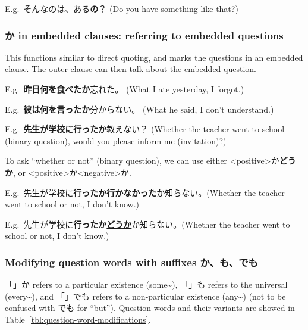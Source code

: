 \documentclass[../nihongo-gakushuu-kyouzai.tex]{subfiles}
\begin{document}
E.g.\ そんなのは、ある\textbf{の}？ (Do you have something like that?)

\subsubsection{か in embedded clauses: referring to embedded questions}
This functions similar to direct quoting, and marks the questions in an embedded clause. The outer clause can then talk about the embedded question.

E.g.\ \textbf{昨日何を食べたか}忘れた。 (What I ate yesterday, I forgot.)

E.g.\ \textbf{彼は何を言ったか}分からない。 (What he said, I don't understand.)

E.g.\ \textbf{先生が学校に行ったか}教えない？ (Whether the teacher went to school (binary question), would you please inform me (invitation)?)

To ask ``whether or not'' (binary question), we can use either <positive>か\textbf{どうか}, or <positive>か<negative>か.

E.g.\ 先生が学校に\textbf{行ったか行かなかった}か知らない。(Whether the teacher went to school or not, I don't know.)

E.g.\ 先生が学校に\textbf{行ったか\ul{どうか}}か知らない。(Whether the teacher went to school or not, I don't know.)


\subsubsection{Modifying question words with suffixes か、も、でも}
「」か refers to a particular existence (some\textasciitilde), 「」も refers to the universal (every\textasciitilde), and 「」でも refers to a non-particular existence (any\textasciitilde) (not to be confused with でも for ``but''). Question words and their variants are showed in Table~\ref{tbl:question-word-modifications}.
\end{document}
